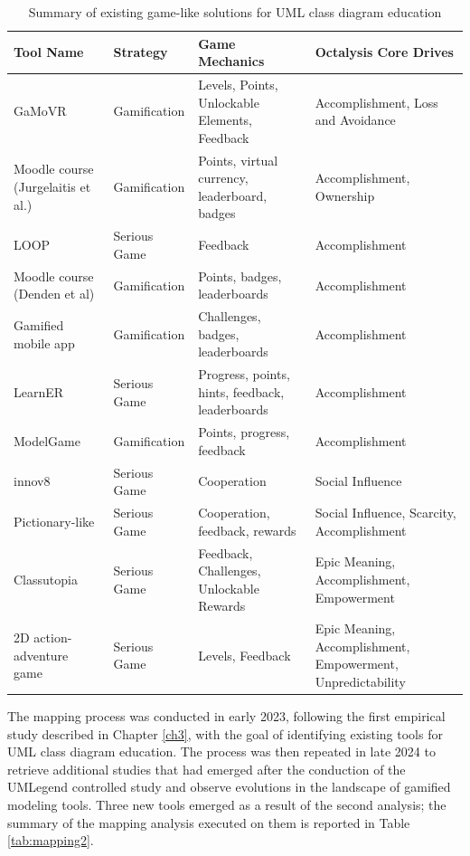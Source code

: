 {\begin{table}[ht]
\centering
\footnotesize
\begin{tabular}{@{}p{3cm}p{2.5cm}p{4cm}p{4cm}@{}}
\toprule
\textbf{Tool Name} & \textbf{Strategy} & \textbf{Game Mechanics} & \textbf{Octalysis Core Drives} \\
\midrule
GaMoVR \cite{yigitbas2022gamification, yigitbas2023design} & Gamification & Levels, Points, Unlockable Elements, Feedback & Accomplishment, Loss and Avoidance \\ 
Moodle course (Jurgelaitis et al.) \cite{jurgelaitis2019implementing} & Gamification & Points, virtual currency, leaderboard, badges & Accomplishment, Ownership \\ 
LOOP\cite{krugel2017computational} & Serious Game & Feedback & Accomplishment \\ 
Moodle course (Denden et al) \cite{denden2021effects} & Gamification & Points, badges, leaderboards & Accomplishment \\
Gamified mobile app \cite{sanjaya2020development} & Gamification & Challenges, badges, leaderboards & Accomplishment \\ 
LearnER \cite{daehli2021exploring} & Serious Game & Progress, points, hints, feedback, leaderboards & Accomplishment \\ 
ModelGame \cite{junior2021modelgame} & Gamification & Points, progress, feedback & Accomplishment \\ 
innov8 \cite{boughzala2017feedback} & Serious Game & Cooperation & Social Influence \\ 
Pictionary-like \cite{dupuychessa2015lego} & Serious Game & Cooperation, feedback, rewards & Social Influence, Scarcity, Accomplishment \\ 
Classutopia \cite{marin2018learning, larenas2018classutopia} & Serious Game & Feedback, Challenges, Unlockable Rewards & Epic Meaning, Accomplishment, Empowerment \\ 
2D action-adventure game \cite{livovsky2014learning} & Serious Game & Levels, Feedback & Epic Meaning, Accomplishment, Empowerment, Unpredictability \\
\bottomrule
\end{tabular}
\caption{Summary of existing game-like solutions for UML class diagram education}
\label{tab:mapping}
\end{table}

The mapping process was conducted in early 2023, following the first empirical study described in Chapter \ref{ch3}, with the goal of identifying existing tools for UML class diagram education. The process was then repeated in late 2024 to retrieve additional studies that had emerged after the conduction of the UMLegend controlled study and observe evolutions in the landscape of gamified modeling tools. Three new tools emerged as a result of the second analysis; the summary of the mapping analysis executed on them is reported in Table \ref{tab:mapping2}.

}

